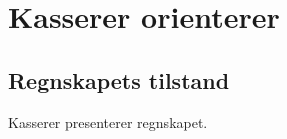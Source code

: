 \documentclass[10pt,norsk,a4paper]{article}
\begin{document}

\section{Kasserer orienterer}
\subsection{Regnskapets tilstand}
Kasserer presenterer regnskapet.
\end{document}

